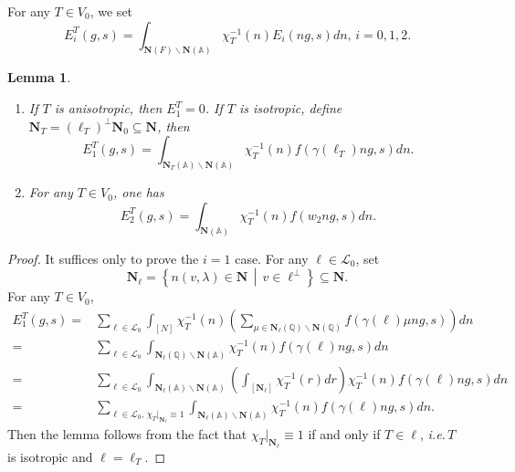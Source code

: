 \documentclass[12pt]{article}
\newtheorem{lemma}[thm]{Lemma}
\theoremstyle{remark}
\theoremstyle{definition}
\newcommand{\Z}{\mathbb{Z}}
\newcommand{\Q}{\mathbb{Q}}
\newcommand{\A}{\mathbb{A}}
\newcommand{\bff}[1]{\mathbf{#1}}
\newcommand{\midline}{\,\middle\vert\,}
\newcommand{\set}[2]{\left\{#1\midline #2\right\}}
\newcommand{\call}[1]{\mathcal{#1}}
\begin{document}
For any $T\in V_{0}$,
we set 
\[E_{i}^{T}(g,s)=\int_{\bff{N}(F)\backslash\bff{N}(\A)}\chi_{T}^{-1}(n)E_{i}(ng,s)dn,\,i=0,1,2.\]

\begin{lemma}
    \label{lemma Eulerian Fourier coefficients}
    \begin{enumerate}
        \item If $T$ is anisotropic, then $E_{1}^{T}=0$. 
            If $T$ is isotropic, define $\bff{N}_{T}=(\ell_{T})^{\perp}\bff{N}_{0}\subseteq \bff{N}$,
            then 
            \[E_{1}^{T}(g,s)=\int_{\bff{N}_{T}(\A)\backslash \bff{N}(\A)}\chi_{T}^{-1}(n)f(\gamma(\ell_{T})ng,s)dn.\]
        \item For any $T\in V_{0}$, one has 
        \[E_{2}^{T}(g,s)=\int_{\bff{N}(\A)}\chi_{T}^{-1}(n)f(w_{2}ng,s)dn.\]
    \end{enumerate}
\end{lemma}
\begin{proof}
    It suffices only to prove the $i=1$ case.
    For any $\ell\in \call{L}_{0}$,
    set \[\bff{N}_{\ell}=\set{n(v,\lambda)\in\bff{N}}{v\in\ell^{\perp}}\subseteq \bff{N}.\]
    For any $T\in V_{0}$,
    \begin{align*}
        E_{1}^{T}(g,s)=&\sum_{\ell\in\call{L}_{0}}\int_{[N]}\chi_{T}^{-1}(n)\left(\sum_{\mu\in\bff{N}_{\ell}(\Q)\backslash \bff{N}(\Q)}f(\gamma(\ell)\mu ng,s)\right)dn\\
        =&\sum_{\ell\in\call{L}_{0}}\int_{\bff{N}_{\ell}(\Q)\backslash\bff{N}(\A)}\chi_{T}^{-1}(n)f(\gamma(\ell)ng,s)dn\\
        =&\sum_{\ell\in\call{L}_{0}}\int_{\bff{N}_{\ell}(\A)\backslash\bff{N}(\A)}\left(\int_{[\bff{N}_{\ell}]}\chi_{T}^{-1}(r)dr\right)\chi_{T}^{-1}(n)f(\gamma(\ell)ng,s)dn\\
        =&\sum_{\ell\in\call{L}_{0},\,\chi_{T}|_{\bff{N}_{\ell}}\equiv 1}\int_{\bff{N}_{\ell}(\A)\backslash \bff{N}(\A)}\chi_{T}^{-1}(n)f(\gamma(\ell)ng,s)dn.
    \end{align*}
    Then the lemma follows from the fact that $\chi_{T}|_{\bff{N}_{\ell}}\equiv 1$ if and only if $T\in\ell$, \emph{i.e.\,}$T$ is isotropic and $\ell=\ell_{T}$. 
\end{proof}
\end{document}
